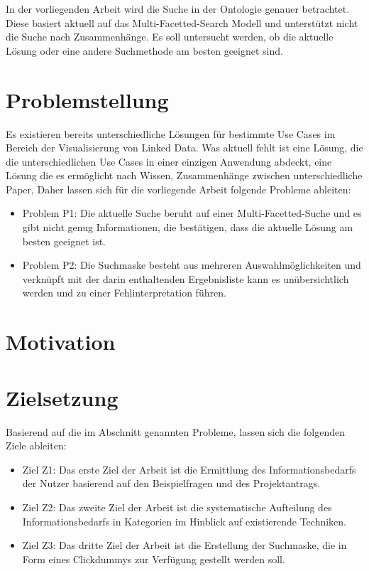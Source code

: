 In der vorliegenden Arbeit wird die Suche in der Ontologie genauer betrachtet. Diese basiert aktuell auf das Multi-Facetted-Search Modell und unterstützt nicht die Suche nach Zusammenhänge. Es soll untersucht werden, ob die aktuelle Lösung oder eine andere Suchmethode am besten geeignet sind. 

\section{Problemstellung}\label{sec:problemstellung}

Es existieren bereits unterschiedliche Lösungen für bestimmte Use Cases im Bereich der Visualisierung von Linked Data. Was aktuell fehlt ist eine Lösung, die die unterschiedlichen Use Cases in einer einzigen Anwendung abdeckt, eine Lösung die es ermöglicht nach Wissen, Zusammenhänge zwischen unterschiedliche Paper,  Daher lassen sich für die vorliegende Arbeit folgende Probleme ableiten:

\begin{itemize}
\item Problem P1: Die aktuelle Suche beruht auf einer Multi-Facetted-Suche und es gibt nicht genug Informationen, die bestätigen, dass die aktuelle Lösung am besten geeignet ist.
\item Problem P2: Die Suchmaske besteht aus mehreren Auswahlmöglichkeiten und verknüpft mit der darin enthaltenden Ergebnisliste kann es unübersichtlich werden und zu einer Fehlinterpretation führen.
\end{itemize}

\section{Motivation}\label{sec:motivation}



\section{Zielsetzung}\label{sec:zielsetzung}

Basierend auf die im Abschnitt  genannten Probleme, lassen sich die folgenden Ziele ableiten:

\begin{itemize}
\item Ziel Z1: Das erste Ziel der Arbeit ist die Ermittlung des Informationsbedarfs der Nutzer basierend auf den Beispielfragen und des Projektantrags. 
\item Ziel Z2: Das zweite Ziel der Arbeit ist die systematische Aufteilung des Informationsbedarfs in Kategorien im Hinblick auf existierende Techniken.
\item Ziel Z3: Das dritte Ziel der Arbeit ist die Erstellung der Suchmaske, die in Form eines Clickdummys zur Verfügung gestellt werden soll.
\end{itemize}

